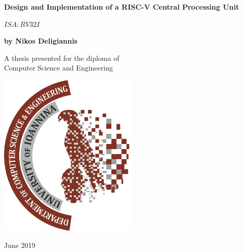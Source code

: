 
\graphicspath{{./teximages/}}
%
	
	\label{FirstPage}
	\begin{titlepage}
		\begin{center}
			\huge
			\textbf{Design and Implementation of a RISC-V Central Processing Unit}
			
			\vspace{0.5cm}
			\textit{$ISA : RV32I$}
			
			\vspace{1.5cm}
			\textbf{by Nikos Deligiannis}
			
			\vfill
			A thesis presented for the diploma of \\
			Computer Science and Engineering
			
			\vspace{0.8cm}
			\includegraphics[width=0.5\textwidth]{department}
			
			\large
			\vspace*{1cm}
			June 2019
			
		\end{center}
		
	\end{titlepage}\

%